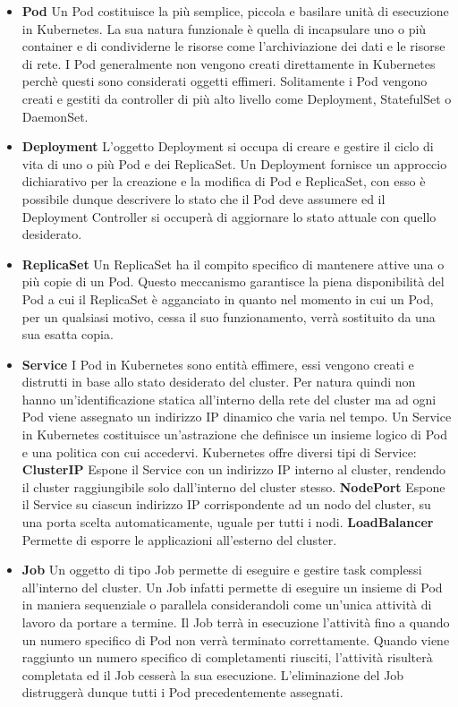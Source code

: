 \begin{itemize}
    \item\textbf{Pod}
    Un Pod costituisce la più semplice, piccola e basilare unità di esecuzione in Kubernetes. La sua natura funzionale è quella di incapsulare uno o più container e di condividerne le risorse come l'archiviazione dei dati e le risorse di rete.
    I Pod generalmente non vengono creati direttamente in Kubernetes perchè questi sono considerati oggetti effimeri. Solitamente i Pod vengono creati e gestiti da controller di più alto livello come Deployment, StatefulSet o DaemonSet.
    \item\textbf{Deployment}
    L'oggetto Deployment si occupa di creare e gestire il ciclo di vita di uno o più Pod e dei ReplicaSet.
    Un Deployment fornisce un approccio dichiarativo per la creazione e la modifica di Pod e ReplicaSet, con esso è possibile dunque descrivere lo stato che il Pod deve assumere ed il Deployment Controller si occuperà di aggiornare lo stato attuale con quello desiderato.
    \item\textbf{ReplicaSet}
    Un ReplicaSet ha il compito specifico di mantenere attive una o più copie di un Pod. Questo meccanismo garantisce la piena disponibilità del Pod a cui il ReplicaSet è agganciato in quanto nel momento in cui un Pod, per un qualsiasi motivo, cessa il suo funzionamento, verrà sostituito da una sua esatta copia.
    \item\textbf{Service}
    I Pod in Kubernetes sono entità effimere, essi vengono creati e distrutti in base allo stato desiderato del cluster. Per natura quindi non hanno un'identificazione statica all'interno della rete del cluster ma ad ogni Pod viene assegnato un indirizzo IP dinamico che varia nel tempo.
    Un Service in Kubernetes costituisce un'astrazione che definisce un insieme logico di Pod e una politica con cui accedervi.
    Kubernetes offre diversi tipi di Service:
        \subitem\textbf{ClusterIP} Espone il Service con un indirizzo IP interno al cluster, rendendo il cluster raggiungibile solo dall'interno del cluster stesso.
        \subitem\textbf{NodePort} Espone il Service su ciascun indirizzo IP corrispondente ad un nodo del cluster, su una porta scelta automaticamente, uguale per tutti i nodi.
        \subitem\textbf{LoadBalancer} Permette di esporre le applicazioni all'esterno del cluster.
    \item\textbf{Job}
    Un oggetto di tipo Job permette di eseguire e gestire task complessi all'interno del cluster. Un Job infatti permette di eseguire un insieme di Pod in maniera sequenziale o parallela considerandoli come un'unica attività di lavoro da portare a termine. Il Job terrà in esecuzione l'attività fino a quando un numero specifico di Pod non verrà terminato correttamente. Quando viene raggiunto un numero specifico di completamenti riusciti, l'attività risulterà completata ed il Job cesserà la sua esecuzione. L'eliminazione del Job distruggerà dunque tutti i Pod precedentemente assegnati. 
\end{itemize}